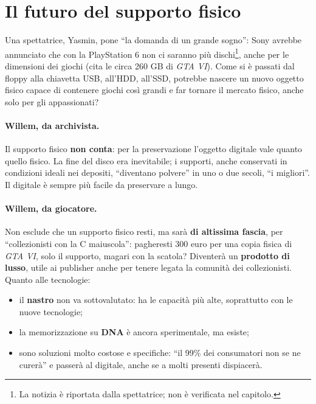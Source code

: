 \section{Il futuro del supporto fisico}
\label{sec:c1-4-fisico}

Una spettatrice, Yasmin, pone ``la domanda di un grande sogno'': Sony avrebbe
annunciato che con la PlayStation 6 non ci saranno più dischi\footnote{La notizia
è riportata dalla spettatrice; non è verificata nel capitolo.}, anche per le
dimensioni dei giochi (cita le circa 260 GB di \emph{GTA VI}). Come si è passati
dal floppy alla chiavetta USB, all'HDD, all'SSD, potrebbe nascere un nuovo oggetto
fisico capace di contenere giochi così grandi e far tornare il mercato fisico,
anche solo per gli appassionati?

\paragraph{Willem, da archivista.} Il supporto fisico \textbf{non conta}: per la
preservazione l'oggetto digitale vale quanto quello fisico. La fine del disco era
inevitabile; i supporti, anche conservati in condizioni ideali nei depositi,
``diventano polvere'' in uno o due secoli, ``i migliori''. Il digitale è sempre
più facile da preservare a lungo.

\paragraph{Willem, da giocatore.} Non esclude che un supporto fisico resti, ma sarà
\textbf{di altissima fascia}, per ``collezionisti con la C maiuscola'': pagheresti
300 euro per una copia fisica di \emph{GTA VI}, solo il supporto, magari con la
scatola? Diventerà un \textbf{prodotto di lusso}, utile ai publisher anche per
tenere legata la comunità dei collezionisti. Quanto alle tecnologie:
\begin{itemize}
  \item il \textbf{nastro} non va sottovalutato: ha le capacità più alte,
        soprattutto con le nuove tecnologie;
  \item la memorizzazione su \textbf{DNA} è ancora sperimentale, ma esiste;
  \item sono soluzioni molto costose e specifiche: ``il 99\% dei consumatori non
        se ne curerà'' e passerà al digitale, anche se a molti presenti
        dispiacerà.
\end{itemize}

